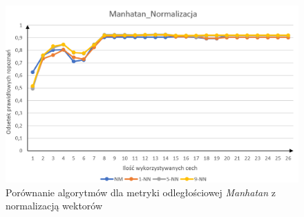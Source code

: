 \documentclass[12pt]{article}
\begin{document}
\begin{figure}[H]
	\centering
		\includegraphics[scale=0.66]{images/algorithms/manhatan_norm.png}
	\caption{Porównanie algorytmów dla metryki odległościowej \textit{Manhatan} z normalizacją wektorów}
\end{figure}
\end{document}
